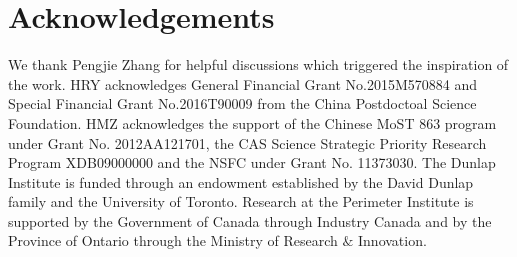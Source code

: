 \documentclass[aps,prd,twocolumn,superscriptaddress,amsfont,amssymb,amsmath,nofootinbib,showpacs,balancelastpage]{revtex4-1}
\begin{document}
\section*{Acknowledgements}
We thank Pengjie Zhang for helpful discussions which triggered
the inspiration of the work.
HRY acknowledges General Financial Grant No.2015M570884 and Special Financial Grant No.2016T90009 from the China Postdoctoal Science Foundation.
HMZ acknowledges the support of the Chinese MoST 863 program under Grant
No. 2012AA121701, the CAS Science Strategic Priority Research Program
XDB09000000 and the NSFC under Grant No. 11373030.
The Dunlap Institute is funded through an endowment established by the David Dunlap family and the University of Toronto.
Research at the Perimeter Institute is supported by the Government of Canada
through Industry Canada and by the Province of Ontario through the Ministry of
Research $\&$ Innovation.

%


\end{document}
